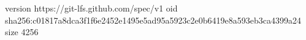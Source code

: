 version https://git-lfs.github.com/spec/v1
oid sha256:c01817a8dca3f1f6e2452e1495e5ad95a5923c2e0b6419e8a593eb3ca4399a24
size 4256
